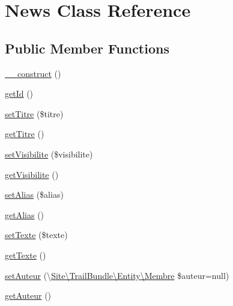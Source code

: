 \hypertarget{class_site_1_1_trail_bundle_1_1_entity_1_1_news}{}\section{News Class Reference}
\label{class_site_1_1_trail_bundle_1_1_entity_1_1_news}
\subsection*{Public Member Functions}
\begin{DoxyCompactItemize}
\item 
\hyperlink{class_site_1_1_trail_bundle_1_1_entity_1_1_news_a095c5d389db211932136b53f25f39685}{\+\_\+\+\_\+construct} ()
\item 
\hyperlink{class_site_1_1_trail_bundle_1_1_entity_1_1_news_a12251d0c022e9e21c137a105ff683f13}{get\+Id} ()
\item 
\hyperlink{class_site_1_1_trail_bundle_1_1_entity_1_1_news_a1d7b0177b6a719345b3a99ec2b48c5a0}{set\+Titre} (\$titre)
\item 
\hyperlink{class_site_1_1_trail_bundle_1_1_entity_1_1_news_a11c380e71778af9871c5bd84b2f50eae}{get\+Titre} ()
\item 
\hyperlink{class_site_1_1_trail_bundle_1_1_entity_1_1_news_ab4afb834b9ea0b0186285b53e50e08e9}{set\+Visibilite} (\$visibilite)
\item 
\hyperlink{class_site_1_1_trail_bundle_1_1_entity_1_1_news_ae8d040a5adaac9b575df64f814b684d6}{get\+Visibilite} ()
\item 
\hyperlink{class_site_1_1_trail_bundle_1_1_entity_1_1_news_ae8f7f6255cdb78df6e0f290d876c1dce}{set\+Alias} (\$alias)
\item 
\hyperlink{class_site_1_1_trail_bundle_1_1_entity_1_1_news_a26e3e0c627051b4287204b3575b81d97}{get\+Alias} ()
\item 
\hyperlink{class_site_1_1_trail_bundle_1_1_entity_1_1_news_a77be937e871225b0ec6f0c35b2547008}{set\+Texte} (\$texte)
\item 
\hyperlink{class_site_1_1_trail_bundle_1_1_entity_1_1_news_a8986201ce046ed1b2e684a7d36cdf8ff}{get\+Texte} ()
\item 
\hyperlink{class_site_1_1_trail_bundle_1_1_entity_1_1_news_a78acaef31f36bb40b76345e2a49f7fde}{set\+Auteur} (\textbackslash{}\hyperlink{class_site_1_1_trail_bundle_1_1_entity_1_1_membre}{Site\textbackslash{}\+Trail\+Bundle\textbackslash{}\+Entity\textbackslash{}\+Membre} \$auteur=null)
\item 
\hyperlink{class_site_1_1_trail_bundle_1_1_entity_1_1_news_ad9cbe4cd4561e831bf6a59bdf8571a3b}{get\+Auteur} ()

\end{DoxyCompactItemize}
